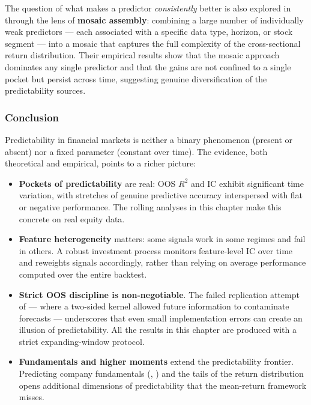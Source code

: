 The question of what makes a predictor \textit{consistently} better is also explored in \cite{cong2024mosaics} through the lens of \textbf{mosaic assembly}: combining a large number of individually weak predictors --- each associated with a specific data type, horizon, or stock segment --- into a mosaic that captures the full complexity of the cross-sectional return distribution. Their empirical results show that the mosaic approach dominates any single predictor and that the gains are not confined to a single pocket but persist across time, suggesting genuine diversification of the predictability sources.

\subsubsection{Conclusion}

Predictability in financial markets is neither a binary phenomenon (present or absent) nor a fixed parameter (constant over time). The evidence, both theoretical and empirical, points to a richer picture:

\begin{itemize}
\item \textbf{Pockets of predictability} are real: OOS $R^2$ and IC exhibit significant time variation, with stretches of genuine predictive accuracy interspersed with flat or negative performance. The rolling analyses in this chapter make this concrete on real equity data.
\item \textbf{Feature heterogeneity} matters: some signals work in some regimes and fail in others. A robust investment process monitors feature-level IC over time and reweights signals accordingly, rather than relying on average performance computed over the entire backtest.
\item \textbf{Strict OOS discipline is non-negotiable}. The failed replication attempt of \cite{cakici2025pockets} --- where a two-sided kernel allowed future information to contaminate forecasts --- underscores that even small implementation errors can create an illusion of predictability. All the results in this chapter are produced with a strict expanding-window protocol.
\item \textbf{Fundamentals and higher moments} extend the predictability frontier. Predicting company fundamentals (\cite{divo2025forecasting}, \cite{cao2024fundamental}) and the tails of the return distribution \citep{uribe2025moving} opens additional dimensions of predictability that the mean-return framework misses.
\end{itemize}


